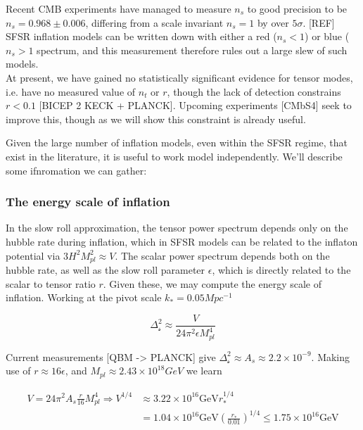 \documentclass[a4paper,11pt]{article}
\newcommand{\Mp}{M_{pl}}
\begin{document}
Recent CMB experiments have managed to measure $n_s$ to good precision to be $n_s=0.968\pm0.006$, differing from a scale invariant $n_s=1$ by over $5\sigma$. [REF] SFSR inflation models can be written down with either a red ($n_s<1$) or blue ($n_s>1$ spectrum, and this measurement therefore rules out a large slew of such models. \\

At present, we have gained no statistically significant evidence for tensor modes, i.e. have no measured value of $n_t$ or $r$, though the lack of detection constrains $r<0.1$ [BICEP 2 KECK + PLANCK]. Upcoming experiments [CMbS4] seek to improve this, though as we will show this constraint is already useful. 

Given the large number of inflation models, even within the SFSR regime, that exist in the literature, it is useful to work model independently. We'll describe some ifnromation we can gather:

\subsubsection{The energy scale of inflation}




In the slow roll approximation, the tensor power spectrum depends only on the hubble rate during inflation, which in SFSR models can be related to the inflaton potential via $3H^2\Mp^2\approx V$. The scalar power spectrum depends both on the hubble rate, as well as the slow roll parameter $\epsilon$, which is directly related to the scalar to tensor ratio $r$. Given these, we may compute the energy scale of inflation. Working at the pivot scale $k_* = 0.05Mpc^{-1}$

\begin{equation}
\Delta^2_{\mathcal{s}}\approx \frac{V}{24\pi^2\epsilon\Mp^4}
\end{equation}

Current measurements [QBM -> PLANCK] give $\Delta^2_{\mathcal{s}} \approx A_s \approx 2.2\times10^{-9}$. Making use of $r\approx 16\epsilon$, and $\Mp \approx 2.43\times 10^{18} GeV$ we learn

\begin{align}
V=24\pi^2A_s\frac{r}{16}\Mp^4 \Rightarrow V^{1/4} &\approx 3.22\times10^{16}\text{GeV}r_*^{1/4}\\
&= 1.04\times10^{16}\text{GeV}(\frac{r_*}{0.01})^{1/4} \leq 1.75\times10^{16}\text{GeV}
\end{align}
\end{document}
